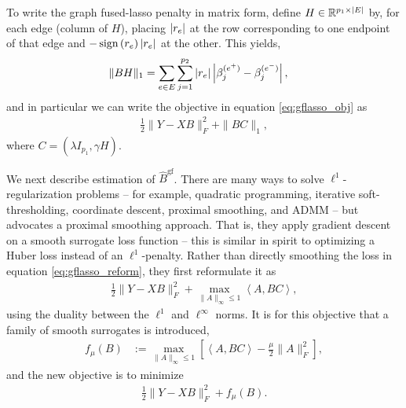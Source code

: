 \documentclass[14pt]{extarticle}
\begin{document}
To write the graph fused-lasso penalty in matrix form, define $H \in
\mathbb{R}^{p_{1} \times \left|E\right|}$ by, for each edge (column of $H$), placing
$\left|r_{e}\right|$ at the row corresponding to one endpoint of that edge and
$-\mathop\mathrm{sign}\left(r_{e}\right)\left|r_{e}\right|$ at the other. This yields,
\begin{align*}
\|BH\|_{1} &= \sum_{e \in E}\sum_{j = 1}^{p_{2}}
\left|r_{e}\right|\left|\beta_{j}^{(e^{+})} - \beta_{j}^{(e^{-})}\right|,
\end{align*}
and in particular we can write the objective in equation \ref{eq:gflasso_obj} as
\begin{align}
  \frac{1}{2}\|Y - XB\|_{F}^{2} + \|BC\|_{1}, \label{eq:gflasso_reform}
\end{align}
where $C = \left(\lambda I_{p_{1}}, \gamma H\right)$.

We next describe estimation of $\hat{B}^{\text{gf}}$. There are many ways to
solve $\ell^{1}$-regularization problems -- for example, quadratic programming,
iterative soft-thresholding, coordinate descent, proximal smoothing, and ADMM --
but \cite{chen2010graph} advocates a proximal smoothing approach. That is, they
apply gradient descent on a smooth surrogate loss function -- this is similar in
spirit to optimizing a Huber loss instead of an $\ell^{1}$-penalty. Rather than
directly smoothing the loss in equation \ref{eq:gflasso_reform}, they first
reformulate it as
\begin{align*}
  \frac{1}{2}\|Y - XB\|_{F}^{2} + \max_{\|A\|_{\infty} \leq 1}
  \left<A, BC\right>,
\end{align*}
using the duality between the $\ell^{1}$ and $\ell^{\infty}$ norms. It is
for this objective that a family of smooth surrogates is introduced,
\begin{align*}
f_{\mu}\left(B\right) &:= \max_{\|A\|_{\infty} \leq 1}
\left[\left<A, BC\right> - \frac{\mu}{2}\|A\|_{F}^{2}\right],
\end{align*}
and the new objective is to minimize
\begin{align*}
\frac{1}{2}\|Y - XB\|_{F}^{2} + f_{\mu}\left(B\right).
\end{align*}
\end{document}
